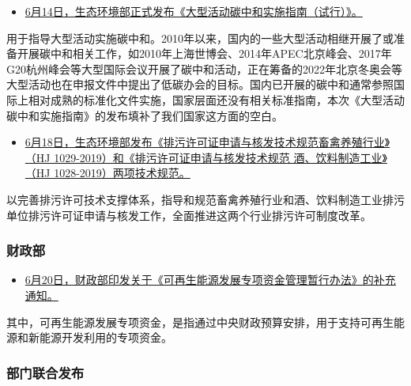 \documentclass[
]{book}
\providecommand{\tightlist}{%
  \setlength{\itemsep}{0pt}\setlength{\parskip}{0pt}}
\begin{document}
\begin{itemize}
\tightlist
\item
  \href{http://www.mee.gov.cn/xxgk2018/xxgk/xxgk01/201906/t20190617_706706.html}{6月14日，生态环境部正式发布《大型活动碳中和实施指南（试行）》。}
\end{itemize}

用于指导大型活动实施碳中和。2010年以来，国内的一些大型活动相继开展了或准备开展碳中和相关工作，如2010年上海世博会、2014年APEC北京峰会、2017年G20杭州峰会等大型国际会议开展了碳中和活动，正在筹备的2022年北京冬奥会等大型活动也在申报文件中提出了低碳办会的目标。国内已开展的碳中和通常参照国际上相对成熟的标准化文件实施，国家层面还没有相关标准指南，本次《大型活动碳中和实施指南》的发布填补了我们国家这方面的空白。

\begin{itemize}
\tightlist
\item
  \href{http://www.mee.gov.cn/xxgk2018/xxgk/xxgk01/201906/t20190621_707297.html}{6月18日，生态环境部发布《排污许可证申请与核发技术规范畜禽养殖行业》（HJ 1029-2019）和《排污许可证申请与核发技术规范 酒、饮料制造工业》（HJ 1028-2019）两项技术规范。}
\end{itemize}

以完善排污许可技术支撑体系，指导和规范畜禽养殖行业和酒、饮料制造工业排污单位排污许可证申请与核发工作，全面推进这两个行业排污许可制度改革。

\hypertarget{ux8d22ux653fux90e8-1}{%
\subsubsection*{财政部}\label{ux8d22ux653fux90e8-1}}

\begin{itemize}
\tightlist
\item
  \href{http://www.mof.gov.cn/mofhome/jinjijianshesi/zhengwuxinxi/zhengcefagui/201906/t20190617_3279412.html}{6月20日，财政部印发关于《可再生能源发展专项资金管理暂行办法》的补充通知。}
\end{itemize}

其中，可再生能源发展专项资金，是指通过中央财政预算安排，用于支持可再生能源和新能源开发利用的专项资金。

\hypertarget{ux90e8ux95e8ux8054ux5408ux53d1ux5e03-6}{%
\subsubsection*{部门联合发布}\label{ux90e8ux95e8ux8054ux5408ux53d1ux5e03-6}}
\end{document}
